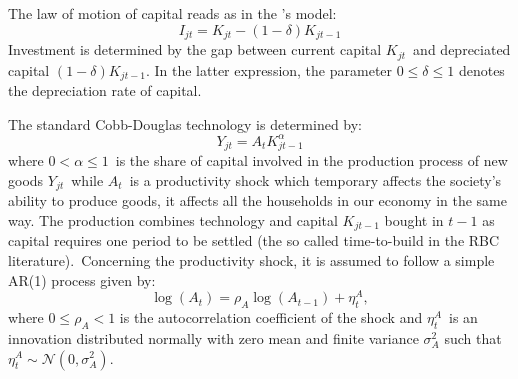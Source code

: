 \documentclass[a4paper,12pt]{article}%
\begin{document}
The law of motion of capital reads as in the \cite{solow1956contribution}'s
model:%
\begin{equation}
I_{jt}=K_{jt}-\left(  1-\delta\right)  K_{jt-1}
\label{eq hh capital law of motion}%
\end{equation}
Investment is determined by the gap between current capital $K_{jt}$\ and
depreciated capital $\left(  1-\delta\right)  K_{jt-1}$. In the latter
expression, the parameter $0\leq\delta\leq1$ denotes the depreciation rate of capital.

The standard Cobb-Douglas technology is determined by:%
\begin{equation}
Y_{jt}=A_{t}K_{jt-1}^{\alpha} \label{eq hh production}%
\end{equation}
where $0<\alpha\leq1$\ is the share of capital involved in the production
process of new goods $Y_{jt}$\ while $A_{t}$\ is a productivity shock which
temporary affects the society's ability to produce goods, it affects all the
households in our economy in the same way. The production combines technology
and capital $K_{jt-1}$ bought in $t-1$ as capital requires one period to be
settled (the so called time-to-build in the RBC literature).\ Concerning the
productivity shock, it is assumed to follow a simple AR(1) process given by:%
\begin{equation}
\log\left(  A_{t}\right)  =\rho_{A}\log\left(  A_{t-1}\right)  +\eta_{t}^{A},
\end{equation}
where $0\leq\rho_{A}<1$ is the autocorrelation coefficient of the shock and
$\eta_{t}^{A}$\ is an innovation distributed normally with zero mean and
finite variance $\sigma_{A}^{2}$ such that $\eta_{t}^{A}\sim\mathcal{N}%
(0,\sigma_{A}^{2})$.%
\end{document}
